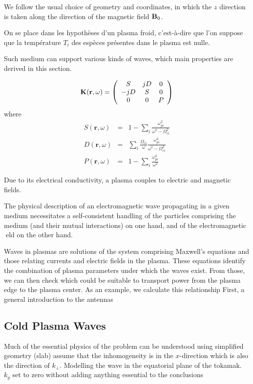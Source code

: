 We follow the usual choice of geometry and coordinates, in which the $z$ direction is taken along the direction of the magnetic field ${\mathbf B}_0$.  

On se place dans les hypothèses d'un plasma froid, c'est-à-dire que
l'on suppose que la température $T_{i}$ des espèces présentes dans
le plasma est nulle\cite[chap.5]{Brambilla1998}.




Such medium can support various kinds of waves, which main properties are derived in this section. 

\begin{equation}
{\mathbf K}({\mathbf r},\omega)
=
\left(\begin{array}{ccc}
	S & j D & 0\\
	-j D & S & 0\\
	0 & 0 & P
\end{array}\right)
\label{eq:tenseur_K_bis}
\end{equation}
where
\begin{eqnarray}
S(\mathbf{r},\omega) 
	& = & 
	1-\sum_{i}\frac{\omega_{pi}^{2}}{\omega^{2}-\Omega_{ci}^{2}}
\label{eq:stix_S}
\\
D(\mathbf{r},\omega) 
	& = & 
	\sum_{i}\frac{\Omega_{ci}}{\omega}\frac{\omega_{pi}^{2}}{\omega^{2}-\Omega_{ci}^{2}}
\label{eq:stix_D}
\\
P(\mathbf{r},\omega) 
	& = & 
	1-\sum_{i}\frac{\omega_{pi}^{2}}{\omega^{2}}
\label{eq:stix_P}
\end{eqnarray}

Due to its electrical conductivity, a plasma couples to electric and magnetic fields. 

The physical description of an electromagnetic wave propagating in a given medium
necessitates a self-consistent handling of the particles comprising the medium (and
their mutual interactions) on one hand, and of the electromagnetic eld on the other
hand.


Waves in plasmas are solutions of the system comprising Maxwell's equations and those relating currents and electric fields in the plasma. These
equations identify the combination of plasma parameters under which the waves
exist. From those, we can then check which could be suitable to transport power
from the plasma edge to the plasma center.
As an example, we calculate this relationship
First, a general introduction to the 
antennas

\subsection{Cold Plasma Waves}
Much of the essential physics of the problem can be understood using simplified geometry (slab)
assume that the inhomogeneity is in the $x$-direction which is also the direction of $k_\perp$. Modelling the wave in the equatorial plane of the tokamak. $k_y$ set to zero without adding anything essential to the conclusions



